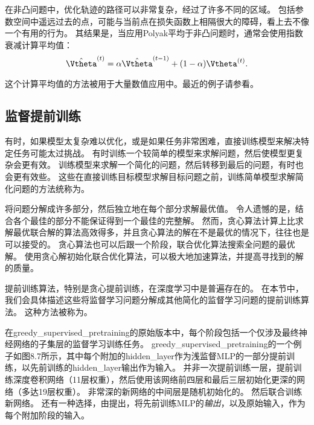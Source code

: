 
在非凸问题中，优化轨迹的路径可以非常复杂，经过了许多不同的区域。
包括参数空间中遥远过去的点，可能与当前点在损失函数上相隔很大的障碍，看上去不像一个有用的行为。
其结果是，当应用Polyak平均于非凸问题时，通常会使用指数衰减计算平均值：
\begin{equation}
    \hat{\Vtheta}^{(t)} = \alpha \hat{\Vtheta}^{(t-1)} + (1-\alpha) \Vtheta^{(t)} .
\end{equation}

这个计算平均值的方法被用于大量数值应用中。最近的例子请参看\cite{Szegedy-et-al-2015}。

\subsection{监督提前训练}
\label{sec:supervised_pretraining}
有时，如果模型太复杂难以优化，或是如果任务非常困难，直接训练模型来解决特定任务可能太过挑战。
有时训练一个较简单的模型来求解问题，然后使模型更复杂会更有效。
训练模型来求解一个简化的问题，然后转移到最后的问题，有时也会更有效些。
这些在直接训练目标模型求解目标问题之前，训练简单模型求解简化问题的方法统称为。


将问题分解成许多部分，然后独立地在每个部分求解最优值。
令人遗憾的是，结合各个最佳的部分不能保证得到一个最佳的完整解。
然而，贪心算法计算上比求解最优联合解的算法高效得多，并且贪心算法的解在不是最优的情况下，往往也是可以接受的。
贪心算法也可以后跟一个阶段，联合优化算法搜索全问题的最优解。
使用贪心解初始化联合优化算法，可以极大地加速算法，并提高寻找到的解的质量。

提前训练算法，特别是贪心提前训练，在深度学习中是普遍存在的。
在本节中，我们会具体描述这些将监督学习问题分解成其他简化的监督学习问题的提前训练算法。
这种方法被称为。


在\gls{greedy_supervised_pretraining}的原始版本\citep{Bengio-nips-2006-short}中，每个阶段包括一个仅涉及最终神经网络的子集层的监督学习训练任务。
\gls{greedy_supervised_pretraining}的一个例子如图8.7所示，其中每个附加的\gls{hidden_layer}作为浅监督MLP的一部分提前训练，以先前训练的\gls{hidden_layer}输出作为输入。
并非一次提前训练一层，\cite{Simonyan2015}提前训练深度卷积网络（11层权重），然后使用该网络前四层和最后三层初始化更深的网络（多达19层权重）。
非常深的新网络的中间层是随机初始化的。
然后联合训练新网络。
还有一种选择，由\cite{Yu+al-2010}提出，将先前训练MLP的\emph{输出}，以及原始输入，作为每个附加阶段的输入。

